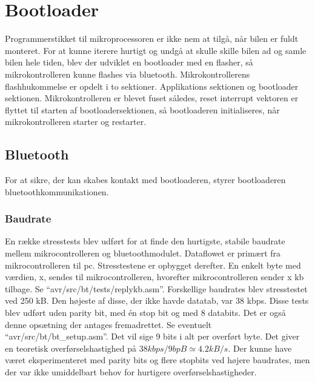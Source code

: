 \section{Bootloader}
Programmerstikket til mikroprocessoren er ikke nem at tilgå, når bilen er fuldt monteret. For at kunne iterere hurtigt og undgå at skulle skille bilen ad og samle bilen hele tiden, blev der udviklet en bootloader med en flasher, så mikrokontrolleren kunne flashes via bluetooth.
Mikrokontrollerens flashhukommelse er opdelt i to sektioner. Applikations sektionen og bootloader sektionen. Mikrokontrolleren er blevet fuset således, reset interrupt vektoren er flyttet til starten af bootloadersektionen, så bootloaderen initialiseres, når mikrokontrolleren starter og restarter.

\subsection{Bluetooth}
For at sikre, der kan skabes kontakt med bootloaderen, styrer bootloaderen bluetoothkommunikationen.
\subsubsection{Baudrate}
En række stresstests blev udført for at finde den hurtigste, stabile baudrate mellem mikrocontrolleren og bluetoothmodulet. Dataflowet er primært fra mikrocontrolleren til pc. Stresstestene er opbygget derefter.
En enkelt byte med værdien, x, sendes til mikrocontrolleren, hvorefter mikrocontrolleren sender x kb tilbage.
Se ``avr/src/bt/tests/replykb.asm''.
Forskellige baudrates blev stresstestet ved 250 kB. Den højeste af disse, der ikke havde datatab, var 38 kbps. Disse tests blev udført uden parity bit, med én stop bit og med 8 databits. Det er også denne opsætning der antages fremadrettet. Se eventuelt ``avr/src/bt/bt\_setup.asm''. Det vil sige 9 bits i alt per overført byte. Det giver en teoretisk overførselshastighed på $38 kbps / 9 bpB \simeq 4.2 kB/s$. Der kunne have været eksperimenteret med parity bits og flere stopbits ved højere baudrates, men der var ikke umiddelbart behov for hurtigere overførselshastigheder.

